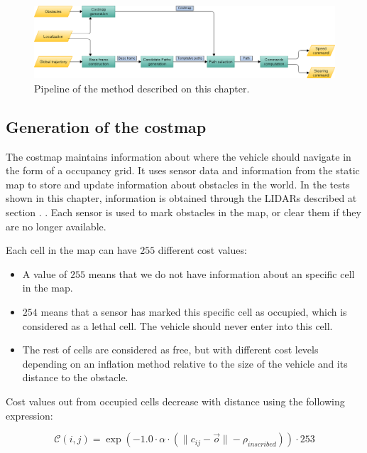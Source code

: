 \begin{figure}[h!]
        \centering
        \includegraphics[width=\textwidth]{pipeline}
        \caption{Pipeline of the method described on this chapter.}\label{fig:cp07_pipeline}
\end{figure}

\subsection{Generation of the costmap}\label{ch:chapter07_01_01}

The costmap maintains information about where the vehicle should navigate in the form of a occupancy grid. It uses sensor data and information from the static map to store and update information about obstacles in the world. In the tests shown in this chapter, information is obtained through the \acp{LIDAR} described at section . . Each sensor is used to mark obstacles in the map, or clear them if they are no longer available.

Each cell in the map can have $255$ different cost values:
\begin{itemize}
 \item A value of $255$ means that we do not have information about an specific cell in the map.
 \item $254$ means that a sensor has marked this specific cell as occupied, which is considered as a lethal cell. The vehicle should never enter into this cell.
 \item The rest of cells are considered as free, but with different cost levels depending on an inflation method relative to the size of the vehicle and its distance to the obstacle.
\end{itemize}

Cost values out from occupied cells decrease with distance using the following expression:

\begin{equation}\label{eq:cp07_costmap_inflation}
 \mathcal{C}(i, j) = \exp (-1.0 \cdot \alpha \cdot ( \|c_{ij}-\vec{o}\| - \rho_{inscribed})) \cdot 253
\end{equation}

